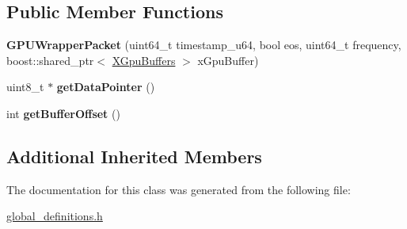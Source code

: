 \subsection*{Public Member Functions}
\begin{DoxyCompactItemize}
\item 
{\bfseries G\+P\+U\+Wrapper\+Packet} (uint64\+\_\+t timestamp\+\_\+u64, bool eos, uint64\+\_\+t frequency, boost\+::shared\+\_\+ptr$<$ \hyperlink{class_x_gpu_buffers}{X\+Gpu\+Buffers} $>$ x\+Gpu\+Buffer)\hypertarget{class_g_p_u_wrapper_packet_a1ed0735f8a61f850f8cf2261e986464a}{}\label{class_g_p_u_wrapper_packet_a1ed0735f8a61f850f8cf2261e986464a}

\item 
uint8\+\_\+t $\ast$ {\bfseries get\+Data\+Pointer} ()\hypertarget{class_g_p_u_wrapper_packet_a18e3d6f093cfaa50df7fd7c9fe809b7a}{}\label{class_g_p_u_wrapper_packet_a18e3d6f093cfaa50df7fd7c9fe809b7a}

\item 
int {\bfseries get\+Buffer\+Offset} ()\hypertarget{class_g_p_u_wrapper_packet_a5896c43f77192e5b1f44506a0390279f}{}\label{class_g_p_u_wrapper_packet_a5896c43f77192e5b1f44506a0390279f}

\end{DoxyCompactItemize}
\subsection*{Additional Inherited Members}


The documentation for this class was generated from the following file\+:\begin{DoxyCompactItemize}
\item 
\hyperlink{global__definitions_8h}{global\+\_\+definitions.\+h}\end{DoxyCompactItemize}
